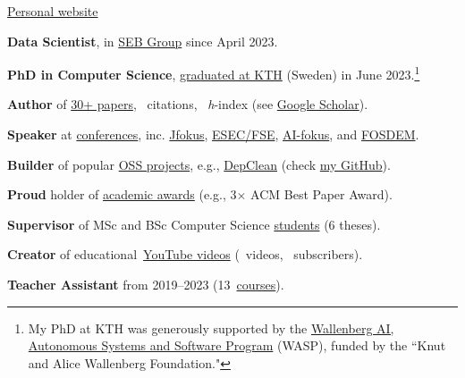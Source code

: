 \documentclass{files/CV/cesar}
\begin{document}


\ybPrintPhoto{}

{\scshape\bfseries\Large {}}

 \href{https://www.cesarsotovalero.net}{Personal website}

\onehalfspacing

\vspace{1.5em}

\textbf{Data Scientist}, in \href{https://www.linkedin.com/in/cesarsotovalero/}{SEB Group} since April 2023.

\textbf{PhD in Computer Science}, \href{https://kth.diva-portal.org/smash/record.jsf?pid=diva2%3A1755964&dswid=5947}{graduated at KTH} (Sweden) in June 2023.\footnote[1]{My PhD at KTH was generously supported by the \href{https://wasp-sweden.org/}{Wallenberg AI, Autonomous Systems and Software Program} (WASP), funded by the ``Knut and Alice Wallenberg Foundation."}

\textbf{Author} of \href{https://www.cesarsotovalero.net/publications}{30+ papers}, \citations~citations, \hindex~\emph{h}-index (see \href{https://scholar.google.es/citations?user=jNBoowwAAAAJ&hl=en}{Google Scholar}).

\textbf{Speaker} at \href{https://www.cesarsotovalero.net/talks}{conferences}, inc.
  \href{https://youtu.be/Xn1ShZPrw2o?si=TFJIJjrmGg5CzxZm}{Jfokus},
  \href{https://youtu.be/cePEl485E_s}{ESEC/FSE},
  \href{https://youtu.be/kFPE9EcxhCs}{AI-fokus}, and
  \href{https://youtu.be/8SndbPMwdWE}{FOSDEM}.

\textbf{Builder} of popular \href{https://www.cesarsotovalero.net/software}{OSS projects}, e.g., \href{https://github.com/castor-software/depclean}{DepClean} (check \href{https://github.com/cesarsotovalero}{my GitHub}).

\textbf{Proud} holder of \href{https://www.cesarsotovalero.net/awards}{academic awards} (e.g., 3$\times$ ACM Best Paper Award).

\textbf{Supervisor} of MSc and BSc Computer Science \href{hhttps://www.cesarsotovalero.net/service#thesis-supervisor}{students} (6 theses).

\textbf{Creator} of educational~\href{https://www.youtube.com/@cesarsotovalero}{YouTube videos} (\youtubevideos~videos, \ytSubscribers~subscribers).

\textbf{Teacher Assistant} from 2019--2023 (13~\href{https://www.cesarsotovalero.net/service#teaching}{courses}).
\end{document}
